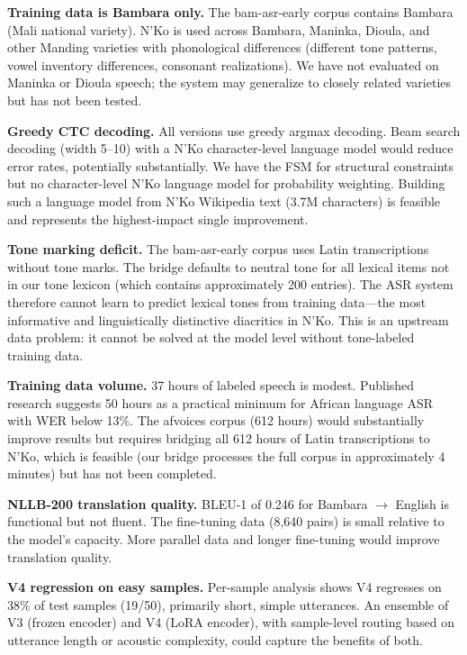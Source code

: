 \documentclass[11pt]{article}
\begin{document}
\textbf{Training data is Bambara only.}
The bam-asr-early corpus contains Bambara (Mali national variety).
N'Ko is used across Bambara, Maninka, Dioula, and other Manding varieties with phonological differences (different tone patterns, vowel inventory differences, consonant realizations).
We have not evaluated on Maninka or Dioula speech; the system may generalize to closely related varieties but has not been tested.

\textbf{Greedy CTC decoding.}
All versions use greedy argmax decoding.
Beam search decoding (width 5--10) with a N'Ko character-level language model would reduce error rates, potentially substantially.
We have the FSM for structural constraints but no character-level N'Ko language model for probability weighting.
Building such a language model from N'Ko Wikipedia text (3.7M characters) is feasible and represents the highest-impact single improvement.

\textbf{Tone marking deficit.}
The bam-asr-early corpus uses Latin transcriptions without tone marks.
The bridge defaults to neutral tone for all lexical items not in our tone lexicon (which contains approximately 200 entries).
The ASR system therefore cannot learn to predict lexical tones from training data---the most informative and linguistically distinctive diacritics in N'Ko.
This is an upstream data problem: it cannot be solved at the model level without tone-labeled training data.

\textbf{Training data volume.}
37 hours of labeled speech is modest.
Published research \cite{data_scaling_2024} suggests 50 hours as a practical minimum for African language ASR with WER below 13\%.
The afvoices corpus (612 hours) would substantially improve results but requires bridging all 612 hours of Latin transcriptions to N'Ko, which is feasible (our bridge processes the full corpus in approximately 4 minutes) but has not been completed.

\textbf{NLLB-200 translation quality.}
BLEU-1 of 0.246 for Bambara $\to$ English is functional but not fluent.
The fine-tuning data (8,640 pairs) is small relative to the model's capacity.
More parallel data and longer fine-tuning would improve translation quality.

\textbf{V4 regression on easy samples.}
Per-sample analysis shows V4 regresses on 38\% of test samples (19/50), primarily short, simple utterances.
An ensemble of V3 (frozen encoder) and V4 (LoRA encoder), with sample-level routing based on utterance length or acoustic complexity, could capture the benefits of both.
\end{document}

